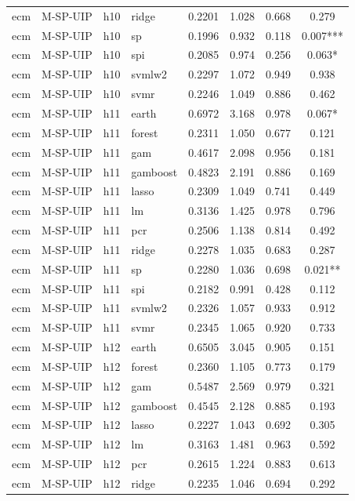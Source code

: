\begin{ThreePartTable}
\begin{longtable}[t]{llclcccc}
ecm & M-SP-UIP & h10 & ridge & 0.2201 & 1.028 & 0.668 & 0.279\\
ecm & M-SP-UIP & h10 & sp & 0.1996 & 0.932 & 0.118 & 0.007***\\
ecm & M-SP-UIP & h10 & spi & 0.2085 & 0.974 & 0.256 & 0.063*\\
ecm & M-SP-UIP & h10 & svmlw2 & 0.2297 & 1.072 & 0.949 & 0.938\\
ecm & M-SP-UIP & h10 & svmr & 0.2246 & 1.049 & 0.886 & 0.462\\
\addlinespace
ecm & M-SP-UIP & h11 & earth & 0.6972 & 3.168 & 0.978 & 0.067*\\
ecm & M-SP-UIP & h11 & forest & 0.2311 & 1.050 & 0.677 & 0.121\\
ecm & M-SP-UIP & h11 & gam & 0.4617 & 2.098 & 0.956 & 0.181\\
ecm & M-SP-UIP & h11 & gamboost & 0.4823 & 2.191 & 0.886 & 0.169\\
ecm & M-SP-UIP & h11 & lasso & 0.2309 & 1.049 & 0.741 & 0.449\\
ecm & M-SP-UIP & h11 & lm & 0.3136 & 1.425 & 0.978 & 0.796\\
ecm & M-SP-UIP & h11 & pcr & 0.2506 & 1.138 & 0.814 & 0.492\\
ecm & M-SP-UIP & h11 & ridge & 0.2278 & 1.035 & 0.683 & 0.287\\
ecm & M-SP-UIP & h11 & sp & 0.2280 & 1.036 & 0.698 & 0.021**\\
ecm & M-SP-UIP & h11 & spi & 0.2182 & 0.991 & 0.428 & 0.112\\
ecm & M-SP-UIP & h11 & svmlw2 & 0.2326 & 1.057 & 0.933 & 0.912\\
ecm & M-SP-UIP & h11 & svmr & 0.2345 & 1.065 & 0.920 & 0.733\\
\addlinespace
ecm & M-SP-UIP & h12 & earth & 0.6505 & 3.045 & 0.905 & 0.151\\
ecm & M-SP-UIP & h12 & forest & 0.2360 & 1.105 & 0.773 & 0.179\\
ecm & M-SP-UIP & h12 & gam & 0.5487 & 2.569 & 0.979 & 0.321\\
ecm & M-SP-UIP & h12 & gamboost & 0.4545 & 2.128 & 0.885 & 0.193\\
ecm & M-SP-UIP & h12 & lasso & 0.2227 & 1.043 & 0.692 & 0.305\\
ecm & M-SP-UIP & h12 & lm & 0.3163 & 1.481 & 0.963 & 0.592\\
ecm & M-SP-UIP & h12 & pcr & 0.2615 & 1.224 & 0.883 & 0.613\\
ecm & M-SP-UIP & h12 & ridge & 0.2235 & 1.046 & 0.694 & 0.292\\

\end{longtable}
\end{ThreePartTable}
